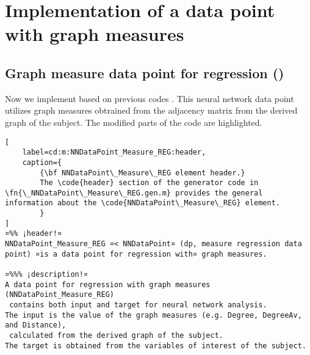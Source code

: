 \documentclass{tufte-handout}
\begin{document}
\clearpage

\section{Implementation of a data point with graph measures}

\subsection{Graph measure data point for regression ()}

Now we implement  based on previous codes .
This neural network data point utilizes graph measures obtrained from the adjacency matrix from the derived graph of the subject. 
The modified parts of the code are highlighted.

\begin{lstlisting}[
	label=cd:m:NNDataPoint_Measure_REG:header,
	caption={
		{\bf NNDataPoint\_Measure\_REG element header.}
		The \code{header} section of the generator code in \fn{\_NNDataPoint\_Measure\_REG.gen.m} provides the general information about the \code{NNDataPoint\_Measure\_REG} element.
		}
]
¤%% ¡header!¤
NNDataPoint_Measure_REG ¤< NNDataPoint¤ (dp, measure regression data point) ¤is a data point for regression with¤ graph measures.

¤%%% ¡description!¤
A data point for regression with graph measures (NNDataPoint_Measure_REG) 
 contains both input and target for neural network analysis.
The input is the value of the graph measures (e.g. Degree, DegreeAv, and Distance), 
 calculated from the derived graph of the subject.
The target is obtained from the variables of interest of the subject.
\end{lstlisting}
\end{document}
